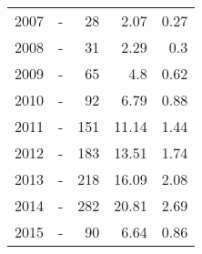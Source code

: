 \begin{longtable}{lXrrr}
        2007 & \multicolumn{1}{X}{-} & %
          \num{28} &
          \num[round-mode=places,round-precision=2]{2,07} &
          \num[round-mode=places,round-precision=2]{0,27} \\

        2008 & \multicolumn{1}{X}{-} & %
          \num{31} &
          \num[round-mode=places,round-precision=2]{2,29} &
          \num[round-mode=places,round-precision=2]{0,3} \\

        2009 & \multicolumn{1}{X}{-} & %
          \num{65} &
          \num[round-mode=places,round-precision=2]{4,8} &
          \num[round-mode=places,round-precision=2]{0,62} \\

        2010 & \multicolumn{1}{X}{-} & %
          \num{92} &
          \num[round-mode=places,round-precision=2]{6,79} &
          \num[round-mode=places,round-precision=2]{0,88} \\

        2011 & \multicolumn{1}{X}{-} & %
          \num{151} &
          \num[round-mode=places,round-precision=2]{11,14} &
          \num[round-mode=places,round-precision=2]{1,44} \\

        2012 & \multicolumn{1}{X}{-} & %
          \num{183} &
          \num[round-mode=places,round-precision=2]{13,51} &
          \num[round-mode=places,round-precision=2]{1,74} \\

        2013 & \multicolumn{1}{X}{-} & %
          \num{218} &
          \num[round-mode=places,round-precision=2]{16,09} &
          \num[round-mode=places,round-precision=2]{2,08} \\

        2014 & \multicolumn{1}{X}{-} & %
          \num{282} &
          \num[round-mode=places,round-precision=2]{20,81} &
          \num[round-mode=places,round-precision=2]{2,69} \\

        2015 & \multicolumn{1}{X}{-} & %
          \num{90} &
          \num[round-mode=places,round-precision=2]{6,64} &
          \num[round-mode=places,round-precision=2]{0,86} \\


\end{longtable}

